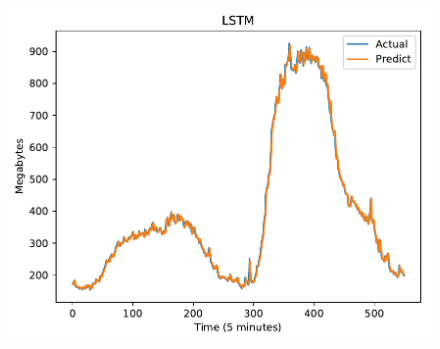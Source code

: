 \documentclass[11pt,twoside]{article}
\begin{document}
\begin{multicols}{2}
\begin{figure}[!ht]
\begin{minipage}[b]{0.33\linewidth}
    \includegraphics[width=0.9\linewidth]{images/pdf/predict/k2/eu_k2_lstm.pdf} 
  \end{minipage} 
  

\end{figure}
\end{multicols}
\end{document}
